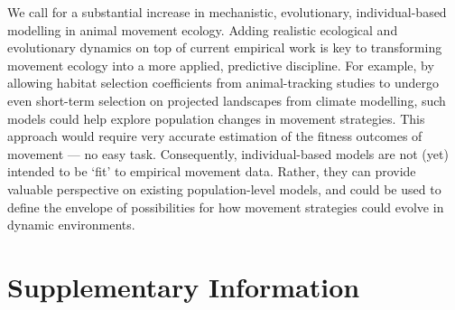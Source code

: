 {We call for a substantial increase in mechanistic, evolutionary, individual-based modelling in animal movement ecology.
Adding realistic ecological and evolutionary dynamics on top of current empirical work is key to transforming movement ecology into a more applied, predictive discipline.
For example, by allowing habitat selection coefficients from animal-tracking studies to undergo even short-term selection on projected landscapes from climate modelling, such models could help explore population changes in movement strategies.
This approach would require very accurate estimation of the fitness outcomes of movement --- no easy task.
Consequently, individual-based models are not (yet) intended to be `fit' to empirical movement data.
Rather, they can provide valuable perspective on existing population-level models, and could be used to define the envelope of possibilities for how movement strategies could evolve in dynamic environments.



{ \begin{center}  \end{center} }


\newpage

\begingroup

\let\clearpage\relax
\let\cleardoublepage\relax
\let\cleardoublepage\relax

{\chapter*{Supplementary Information}}

}
